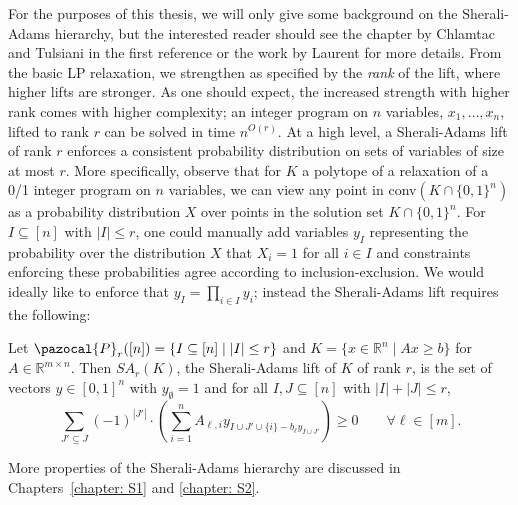For the purposes of this thesis, we will only give some background on the Sherali-Adams hierarchy, but the 
interested reader should see the chapter by Chlamtac and Tulsiani in the first reference or the work by Laurent for more details\cite{SAref, Comparison-of-Hierarchies-Laurent-MOR03}.
From the basic LP relaxation, we strengthen as specified by the \emph{rank} of the lift, where higher lifts are stronger.
As one should expect, the increased strength with higher rank comes with higher complexity;
an integer program on $n$ variables, $x_1,\ldots,x_n$, lifted to rank $r$ can be solved in time $n^{O(r)}$.
At a high level, a Sherali-Adams lift of rank $r$ enforces a consistent probability distribution on sets of variables 
of size at most $r$. 
More specifically, observe that for $K$ a polytope of a relaxation of a 0/1 integer program on $n$ variables, 
we can view any point in conv$(K \cap \{0,1\}^n)$ 
as a probability distribution $X$ over points in the solution set $K \cap \{0,1\}^n$.
For $I \subseteq [n]$ with $|I| \leq r$, one could manually add variables $y_I$ representing the probability over the distribution $X$ 
that $X_i=1$ for all $i \in I$ and constraints enforcing these probabilities agree according to inclusion-exclusion.
We would ideally like to enforce that $y_I = \prod_{i \in I} y_i$; instead the Sherali-Adams lift requires the following:
\begin{definition}
Let $\pazocal{P}_r([n]) = \{I \subseteq [n] \mid |I| \leq r\}$ and $K=\{x \in \mathbb{R}^n \mid Ax \geq b\}$ for $A \in \mathbb{R}^{m \times n}$. 
Then $SA_r(K)$, the Sherali-Adams lift of $K$ of rank $r$, is the set of vectors $y \in [0,1]^{n}$ with $y_{\emptyset}=1$ and for all $I,J \subseteq [n]$ with $|I|+|J|\leq r$,
$$
\sum_{ J' \subseteq J} (-1)^{|J'|} \cdot  \left ( \sum_{i=1}^n A_{\ell,i}y_{I \cup J' \cup \{i\}-b_{\ell}y_{I \cup J'}}\right ) \geq 0 \qquad \forall \ell \in [m].
$$
\end{definition}
More properties of the Sherali-Adams hierarchy are discussed in Chapters~\ref{chapter: S1} and \ref{chapter: S2}.


